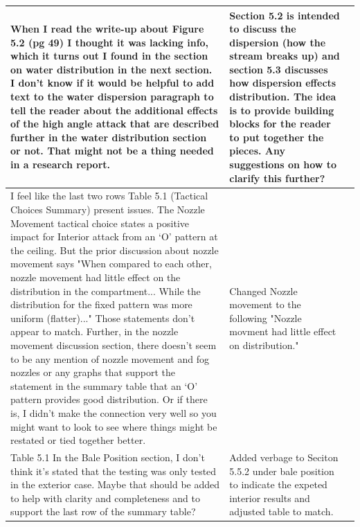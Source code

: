\documentclass[12pt,oneside]{book}
\begin{document}
\begin{longtable}{|L{2.6in}|L{2.6in}|c|}
		\hline
		When I read the write-up about Figure 5.2 (pg 49) I thought it was lacking info, which it turns out I found in the section on water distribution in the next section. I don't know if it would be helpful to add text to the water dispersion paragraph to tell the reader about the additional effects of the high angle attack that are described further in the water distribution section or not. That might not be a thing needed in a research report. & 
		Section 5.2 is intended to discuss the dispersion (how the stream breaks up) and section 5.3 discusses how dispersion effects distribution. The idea is to provide building blocks for the reader to put together the pieces. \textbf{Any suggestions on how to clarify this further?} & \\

		\hline
		I feel like the last two rows Table 5.1 (Tactical Choices Summary) present issues. The Nozzle Movement tactical choice states a positive impact for Interior attack from an `O' pattern at the ceiling. But the prior discussion about nozzle movement says "When compared to each other, nozzle movement had little effect on the distribution in the compartment... While the distribution for the fixed pattern was more uniform (flatter)..." Those statements don't appear to match. Further, in the nozzle movement discussion section, there doesn't seem to be any mention of nozzle movement and fog nozzles or any graphs that support the statement in the summary table that an `O' pattern provides good distribution. Or if there is, I didn't make the connection very well so you might want to look to see where things might be restated or tied together better. &
		Changed Nozzle movement to the following "Nozzle movment had little effect on distribution." & \checkmark \\

		\hline 
		Table 5.1 In the Bale Position section, I don't think it's stated that the testing was only tested in the exterior case. Maybe that should be added to help with clarity and completeness and to support the last row of the summary table? &
		Added verbage to Seciton 5.5.2 under bale position to indicate the expeted interior results and adjusted table to match. & \checkmark \\  


\end{longtable}
\end{document}

